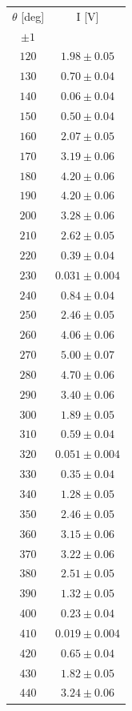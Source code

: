 \documentclass[10pt,oneside,a4paper]{article}
\begin{document}
\begin{table}[H]
\centering
{}
\label{tab:malus2}
\begin{tabular}{cc}
\hline
 $\theta$ [deg]& I [V]\\
 $\pm 1$ & \\
\hline
  $ 120$&$ 1.98 \pm 0.05$ \\
  $ 130$&$ 0.70 \pm 0.04$ \\
  $ 140$& $0.06  \pm0.04 $\\
  $ 150$&$ 0.50 \pm 0.04$ \\
  $ 160$ &$ 2.07 \pm 0.05$ \\
  $ 170$&$ 3.19 \pm 0.06$ \\
  $ 180$&$ 4.20 \pm 0.06$ \\
  $ 190$&$ 4.20 \pm 0.06$ \\
  $ 200$&$ 3.28 \pm 0.06$ \\
  $ 210$&$ 2.62 \pm 0.05$ \\
  $ 220$&$ 0.39 \pm 0.04$ \\
  $ 230$&$ 0.031 \pm 0.004$ \\
  $ 240$ &$ 0.84 \pm 0.04$ \\
  $ 250 $&$ 2.46 \pm 0.05$ \\
  $ 260$ &$ 4.06 \pm 0.06$ \\
  $ 270$ &$ 5.00 \pm 0.07$ \\
  $ 280$ &$ 4.70 \pm 0.06$ \\
  $ 290$ &$ 3.40 \pm0.06$ \\
  $ 300$ &$ 1.89 \pm0.05$ \\
  $ 310$ &$ 0.59 \pm 0.04$ \\
  $ 320$ &$ 0.051 \pm 0.004$ \\
  $ 330$ &$ 0.35 \pm 0.04$ \\
  $ 340$ &$ 1.28 \pm 0.05$ \\
  $ 350$ &$ 2.46 \pm 0.05$ \\
  $ 360$ &$ 3.15 \pm 0.06$ \\
  $ 370$ &$ 3.22 \pm 0.06$ \\
  $ 380$ &$ 2.51 \pm 0.05$ \\
  $ 390$ &$ 1.32 \pm 0.05$ \\
  $ 400$ &$ 0.23 \pm 0.04$ \\
  $ 410$ &$ 0.019 \pm 0.004$ \\
  $ 420$ &$ 0.65 \pm 0.04$ \\
  $ 430$ &$ 1.82 \pm 0.05$ \\
  $ 440$ &$ 3.24 \pm 0.06$ \\

\end{tabular}
\end{table}
\end{document}
